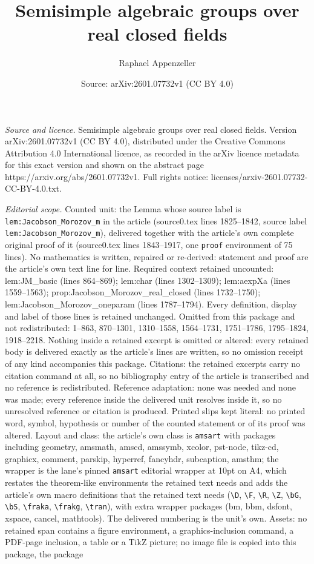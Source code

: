 \documentclass[10pt,a4paper]{amsart}
\title[Semisimple algebraic groups over real closed fields]{Semisimple algebraic groups over real closed fields}
\author{Raphael Appenzeller}
\date{Source: arXiv:2601.07732v1 (CC BY 4.0)}
\begin{document}
\maketitle

\noindent\emph{Source and licence.} Semisimple algebraic groups over real closed fields. Version arXiv:2601.07732v1 (CC BY 4.0), distributed under the Creative Commons Attribution 4.0 International licence, as recorded in the arXiv licence metadata for this exact version and shown on the abstract page https://arxiv.org/abs/2601.07732v1. Full rights notice: licenses/arxiv-2601.07732-CC-BY-4.0.txt.\par\smallskip

\noindent\textit{Editorial scope.} Counted unit: the Lemma whose source label is \texttt{lem:Jacobson\_Morozov\_m} in the article (source0.tex lines 1825--1842, source label \texttt{lem:Jacobson\_Morozov\_m}), delivered together with the article's own complete original proof of it (source0.tex lines 1843--1917, one \texttt{proof} environment of 75 lines). No mathematics is written, repaired or re-derived: statement and proof are the article's own text line for line. Required context retained uncounted: lem:JM\_basic (lines 864--869); lem:char (lines 1302--1309); lem:aexpXa (lines 1559--1563); prop:Jacobson\_Morozov\_real\_closed (lines 1732--1750); lem:Jacobson\_Morozov\_oneparam (lines 1787--1794). Every definition, display and label of those lines is retained unchanged. Omitted from this package and not redistributed: 1--863, 870--1301, 1310--1558, 1564--1731, 1751--1786, 1795--1824, 1918--2218. Nothing inside a retained excerpt is omitted or altered: every retained body is delivered exactly as the article's lines are written, so no omission receipt of any kind accompanies this package. Citations: the retained excerpts carry no citation command at all, so no bibliography entry of the article is transcribed and no reference is redistributed. Reference adaptation: none was needed and none was made; every reference inside the delivered unit resolves inside it, so no unresolved reference or citation is produced. Printed slips kept literal: no printed word, symbol, hypothesis or number of the counted statement or of its proof was altered. Layout and class: the article's own class is \texttt{amsart} with packages including geometry, amsmath, amscd, amssymb, xcolor, pst-node, tikz-cd, graphicx, comment, parskip, hyperref, fancyhdr, subcaption, amsthm; the wrapper is the lane's pinned \texttt{amsart} editorial wrapper at 10pt on A4, which restates the theorem-like environments the retained text needs and adds the article's own macro definitions that the retained text needs (\texttt{\textbackslash D}, \texttt{\textbackslash F}, \texttt{\textbackslash R}, \texttt{\textbackslash Z}, \texttt{\textbackslash bG}, \texttt{\textbackslash bS}, \texttt{\textbackslash fraka}, \texttt{\textbackslash frakg}, \texttt{\textbackslash tran}), with extra wrapper packages (bm, bbm, dsfont, xspace, cancel, mathtools). The delivered numbering is the unit's own. Assets: no retained span contains a figure environment, a graphics-inclusion command, a PDF-page inclusion, a table or a TikZ picture; no image file is copied into this package, the package 
\end{document}
